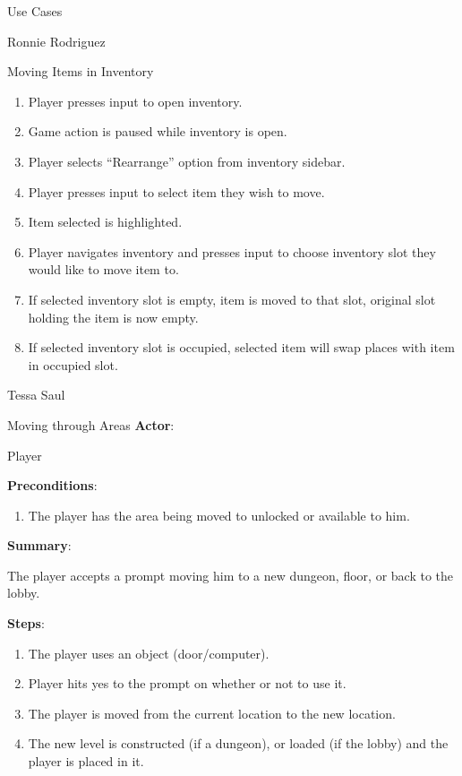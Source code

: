 \documentclass[12pt]{report}
\begin{document}
\begin{section}{Use Cases}
\begin{subsection}{Ronnie Rodriguez}
\begin{subsubsection}{Moving Items in Inventory}
\begin{enumerate}
\item Player presses input to open inventory.
\item Game action is paused while inventory is open.
\item Player selects ``Rearrange'' option from inventory sidebar.
\item Player presses input to select item they wish to move.
\item Item selected is highlighted.
\item Player navigates inventory and presses input to choose inventory slot
they would like to move item to.
\item If selected inventory slot is empty, item is moved to that slot,
original slot holding the item is now empty.
\item If selected inventory slot is occupied, selected item will swap places
with item in occupied slot. 
\end{enumerate}
\end{subsubsection}
\end{subsection}

\begin{subsection}{Tessa Saul}
\begin{subsubsection}{Moving through Areas}
\textbf{Actor}:

Player

\textbf{Preconditions}:

\begin{enumerate}
\item The player has the area being moved to unlocked or available to him.
\end{enumerate}

\textbf{Summary}:

The player accepts a prompt moving him to a new dungeon, floor, or
back to the lobby.

\textbf{Steps}:

\begin{enumerate}
\item The player uses an object (door/computer).
\item Player hits yes to the prompt on whether or not to use it.
\item The player is moved from the current location to the new location.
\item The new level is constructed (if a dungeon), or loaded (if the lobby)
and the player is placed in it.
\end{enumerate}
\end{subsubsection}


\end{subsection}
\end{section}
\end{document}
